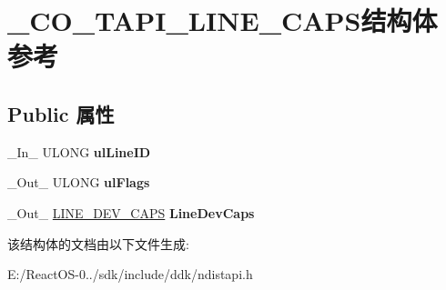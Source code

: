 \hypertarget{struct___c_o___t_a_p_i___l_i_n_e___c_a_p_s}{}\section{\+\_\+\+C\+O\+\_\+\+T\+A\+P\+I\+\_\+\+L\+I\+N\+E\+\_\+\+C\+A\+P\+S结构体 参考}
\label{struct___c_o___t_a_p_i___l_i_n_e___c_a_p_s}
\subsection*{Public 属性}
\begin{DoxyCompactItemize}
\item 
\mbox{\label{struct___c_o___t_a_p_i___l_i_n_e___c_a_p_s_aaa166b3e2b84de8afbb71af4eb7bf834}} 
\+\_\+\+In\+\_\+ U\+L\+O\+NG {\bfseries ul\+Line\+ID}
\item 
\mbox{\label{struct___c_o___t_a_p_i___l_i_n_e___c_a_p_s_aea409a62c63d4e46b6a073162006a574}} 
\+\_\+\+Out\+\_\+ U\+L\+O\+NG {\bfseries ul\+Flags}
\item 
\mbox{\label{struct___c_o___t_a_p_i___l_i_n_e___c_a_p_s_a634273aa82f1e23994902086709b511d}} 
\+\_\+\+Out\+\_\+ \hyperlink{struct___l_i_n_e___d_e_v___c_a_p_s}{L\+I\+N\+E\+\_\+\+D\+E\+V\+\_\+\+C\+A\+PS} {\bfseries Line\+Dev\+Caps}
\end{DoxyCompactItemize}


该结构体的文档由以下文件生成\+:\begin{DoxyCompactItemize}
\item 
E\+:/\+React\+O\+S-\/0../sdk/include/ddk/ndistapi.\+h\end{DoxyCompactItemize}
